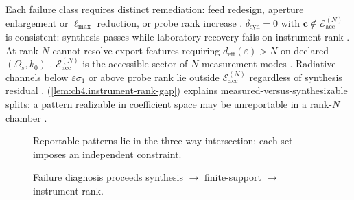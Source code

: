 Each failure class requires distinct remediation: feed redesign, aperture enlargement or \(\ell_{\max}\) reduction, or probe rank increase
\cite{stratton1941}.
\label{cor:ch4.cert-vs-syn-split}
\(\delta_{\mathrm{syn}}=0\) with \(\mathbf{c}\notin\mathcal{E}_{\mathrm{acc}}^{(N)}\) is consistent: synthesis passes while laboratory recovery fails on
instrument rank \cite{harrington2001}.
\label{lem:ch4.instrument-rank-gap}
At rank \(N\) cannot resolve export features requiring \(d_{\mathrm{eff}}(\varepsilon)>N\) on declared \((\Omega_{s},k_{0})\)
\cite{stratton1941}.
\(\mathcal{E}_{\mathrm{acc}}^{(N)}\) is the accessible sector of \(N\) measurement modes \cite{harrington2001}. Radiative channels below
\(\varepsilon\sigma_{1}\) or above probe rank lie outside \(\mathcal{E}_{\mathrm{acc}}^{(N)}\) regardless of synthesis residual \cite{devaney2004}.
(\ref{lem:ch4.instrument-rank-gap}) explains measured-versus-synthesizable splits: a pattern realizable in coefficient space may be unreportable in a rank-\(N\)
chamber \cite{harrington2001}.
\begin{figure}[t]
\centering
{}
\caption{Reportable patterns lie in the three-way intersection; each set imposes an independent constraint.}
\label{fig:ch4.three-way-cert}
\end{figure}
\begin{figure}[t]
\centering
{}
\caption{Failure diagnosis proceeds synthesis \(\to\) finite-support \(\to\) instrument rank.}
\label{fig:ch4.failure-diagnosis}
\end{figure}
